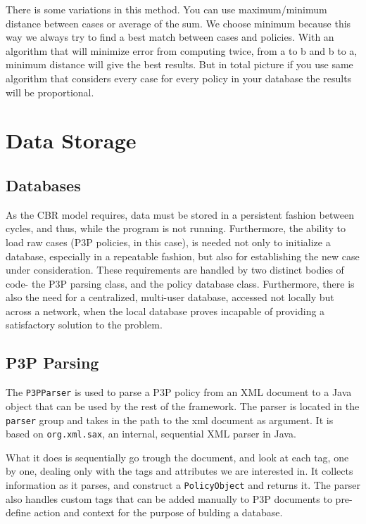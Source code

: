 There is some variations in this method. You can use maximum/minimum distance between cases or average of the sum. We choose minimum because this way we always try to find a best match between cases and policies. With an algorithm that will minimize error from computing twice, from a to b and b to a, minimum distance will give the best results. But in total picture if you use same algorithm that considers every case for every policy in your database the results will be proportional.

\section{Data Storage}

\subsection{Databases}

As the CBR model requires, data must be stored in a persistent fashion between cycles, and thus, while the program is not running. Furthermore, the ability to load raw cases (P3P policies, in this case), is needed not only to initialize a database, especially in a repeatable fashion, but also for establishing the new case under consideration. These requirements are handled by two distinct bodies of code- the P3P parsing class, and the policy database class. Furthermore, there is also the need for a centralized, multi-user database, accessed not locally but across a network, when the local database proves incapable of providing a satisfactory solution to the problem.

\subsection{P3P Parsing}  %
The \texttt{P3PParser} is used to parse a P3P policy from an XML document to a Java object that can be used by the rest of the framework. The parser is located in the \texttt{parser} group and takes in the path to the xml document as argument. It is based on \texttt{org.xml.sax}, an internal, sequential XML parser in Java.

What it does is sequentially go trough the document, and look at each tag, one by one, dealing only with the tags and attributes we are interested in. It collects information as it parses, and construct a \texttt{PolicyObject} and returns it. The parser also handles custom tags that can be added manually to P3P documents to pre-define action and context for the purpose of bulding a database.

